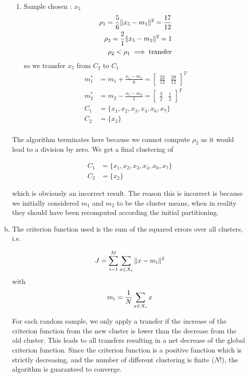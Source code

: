 \documentclass[a4paper, 10pt, twoside]{article}
\begin{document}
\begin{enumerate}[a)]
\begin{enumerate}[1.]
		      \item Sample chosen : $x_5$
		            \begin{align*}
			            \rho_1 = \frac{5}{6}\Vert x_5-m_1 \Vert^2 = \frac{17}{12} \\
			            \rho_2 = \frac{2}{1}\Vert x_5-m_2 \Vert^2 = 1             \\
			            \rho_2 < \rho_1 \implies \text{transfer}             \\
		            \end{align*}
		            so we transfer $x_5$ from $C_2$ to $C_1$
		            \begin{align*}
			            m_1^* & = m_1 + \frac{x_5-m_1}{6} = \begin{bmatrix} \frac{23}{12} & \frac{29}{12}\end{bmatrix}^T \\
			            m_2^* & = m_2 - \frac{x_5-m_2}{1} = \begin{bmatrix} \frac{3}{2} & \frac{1}{2}\end{bmatrix}^T \\
			            C_1   & = \{ x_1, x_2, x_3, x_4, x_6, x_7\}                      \\
			            C_2   & = \{ x_2 \}                                              \\
		            \end{align*}
	      \end{enumerate}

	      The algorithm terminates here because we cannot compute $\rho_2$ as it would lead to a division by zero. We get a final clustering of

	      \begin{align*}
		      C_1 & = \{ x_1, x_2, x_3, x_4, x_6, x_7\} \\
		      C_2 & = \{ x_2 \}
	      \end{align*}

	      which is obviously an incorrect result. The reason this is incorrect is because we initially considered $m_1$ and $m_2$ to be the cluster means, when in reality they should have been recomputed according the initial partitioning.

	\item The criterion function used is the sum of the squared errors over all clusters, i.e.

	      \[
		      J = \sum_{i=1}^M \sum_{x \in X_i} \Vert x-m_i \Vert^2 \\
	      \]
	      with
	      \[
		      m_i = \frac{1}{N} \sum_{x \in X_i} x
	      \]

	      For each random sample, we only apply a transfer if the increase of the criterion function from the new cluster is lower than the decrease from the old cluster. This leads to all transfers resulting in a net decrease of the global criterion function. Since the criterion function is a positive function which is strictly decreasing, and the number of different clustering is finite ($N!$), the algorithm is guaranteed to converge.
\end{enumerate}
\end{document}
